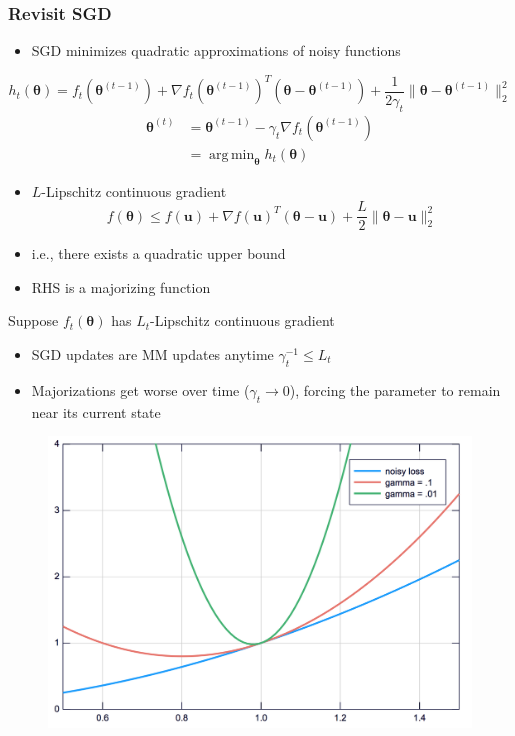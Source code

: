 \documentclass{beamer}
\newcommand{\iter}[2]{#1^{(#2)}}
\DeclareMathOperator*{\argmin}{arg\,min}
\begin{document}
\begin{frame}
  \frametitle{Revisit SGD}
  \begin{itemize}
    \item SGD minimizes quadratic approximations of noisy functions
  \end{itemize}
  $$h_t(\bm\theta) = f_t(\iter{\bm\theta}{t-1}) + \nabla f_t(\iter{\bm\theta}{t-1})^T(\bm\theta - \iter{\bm\theta}{t-1}) + \frac{1}{2\gamma_t}\|\bm\theta - \iter{\bm\theta}{t-1}\|_2^2$$
  \vspace{5mm}
  $$\begin{aligned}\iter{\bm\theta}{t} &= \iter{\bm\theta}{t-1} - \gamma_t \nabla f_t(\iter{\bm\theta}{t-1}) \\ &= \argmin_{\bm\theta} h_t(\bm\theta)\end{aligned}$$

\end{frame}
\begin{frame}
  \begin{itemize}
    \item $L$-Lipschitz continuous gradient
    $$f(\bm\theta) \le f(\bm u) + \nabla f(\bm u)^T(\bm\theta - \bm u) + \frac{L}{2}\|\bm\theta - \bm u\|_2^2$$
    \item i.e., there exists a quadratic upper bound
    \item RHS is a majorizing function
  \end{itemize}
\end{frame}
\begin{frame}
  Suppose $f_t(\bm\theta)$ has $L_t$-Lipschitz continuous gradient
  \begin{itemize}
    \item SGD updates are MM updates anytime $\gamma_t^{-1} \le L_t$
  \end{itemize}
\end{frame}
\begin{frame}
  \begin{itemize}
    \item Majorizations get worse over time ($\gamma_t \rightarrow 0$), forcing the parameter to remain near its current state
  \end{itemize}
  \begin{figure}
    \includegraphics[width=.7\textwidth]{figures/quadraticupperbound.png}
  \end{figure}
\end{frame}
\end{document}
